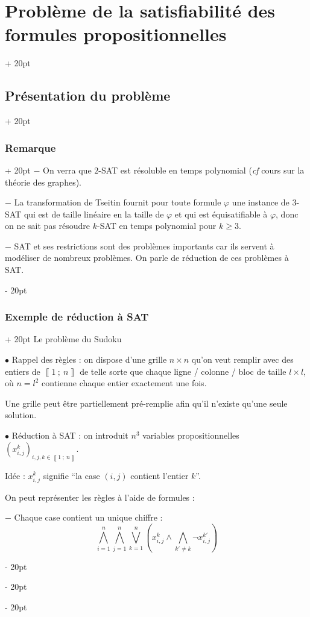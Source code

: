 \documentclass[a4paper, 12pt, twoside]{article}
\newcommand{\nset}[2]{\left\llbracket #1\ ;\ #2 \right\rrbracket}
\newcommand{\lr}[1]{\left( #1 \right)}
\renewcommand{\ge}{\geqslant}
\newcommand{\ind}[1][20pt]{\advance\leftskip + #1}
\newcommand{\deind}[1][20pt]{\advance\leftskip - #1}
\newenvironment{indt}[2][20pt]{#2 \par \ind[#1]}{\par \deind} %
\begin{document}
\begin{indt}{\section{Problème de la satisfiabilité des formules propositionnelles}}
\begin{indt}{\subsection{Présentation du problème}}
\begin{indt}{\subsubsection{Remarque}}
                $-$ On verra que $2$-SAT est résoluble en temps polynomial (\textit{cf} cours sur la théorie des graphes).
                
                $-$ La transformation de Tseitin fournit pour toute formule $\varphi$ une instance de $3$-SAT qui est de taille linéaire en la taille de $\varphi$ et qui est équisatifiable à $\varphi$, donc on ne sait pas résoudre $k$-SAT en temps polynomial pour $k \ge 3$.
                
                $-$ SAT et ses restrictions sont des problèmes importants car ils servent à modéliser de nombreux problèmes. On parle de réduction de ces problèmes à SAT.
            \end{indt}
            
            \vspace{12pt}
            
            \begin{indt}{\subsubsection{Exemple de réduction à SAT}}
                Le problème du Sudoku
                
                $\bullet$ Rappel des règles : on dispose d'une grille $n \times n$ qu'on veut remplir avec des entiers de $\nset 1 n$ de telle sorte que chaque ligne / colonne / bloc de taille $l \times l$, où $n = l^2$ contienne chaque entier exactement une fois.
                
                Une grille peut être partiellement pré-remplie afin qu'il n'existe qu'une seule solution.
                
                \vspace{12pt}
                
                $\bullet$ Réduction à SAT : on introduit $n^3$ variables propositionnelles $(x_{i, j}^k)_{i, j, k \in \nset 1 n}$.
                
                Idée : $x_{i, j}^k$ signifie ``la case $(i, j)$ contient l'entier $k$''.
                
                On peut représenter les règles à l'aide de formules :
                
                $-$ Chaque case contient un unique chiffre :
                    \[ \bigwedge_{i = 1}^n \bigwedge_{j = 1}^n \bigvee_{k = 1}^n \lr{x_{i, j}^k \wedge \bigwedge_{k' \neq k} \neg x_{i, j}^{k'}} \]
                

\end{indt}
\end{indt}
\end{indt}
\end{document}
